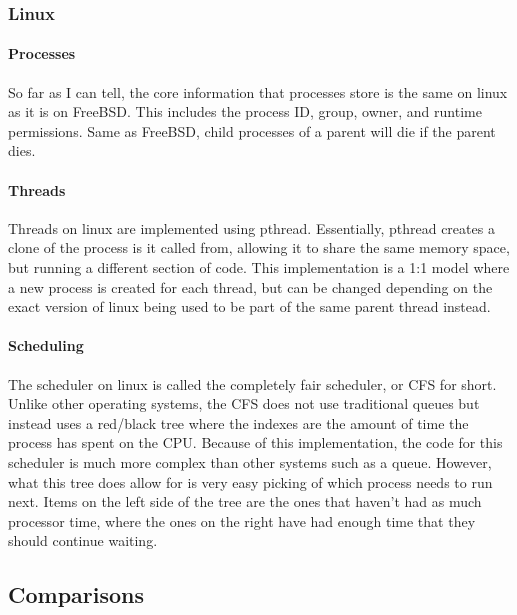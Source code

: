 \subsubsection{Linux}
\paragraph{Processes}
So far as I can tell, the core information that processes store is the same on linux as it is on FreeBSD. This includes the process ID, group, owner, and runtime permissions. Same as FreeBSD, child processes of a parent will die if the parent dies.
\paragraph{Threads}
Threads on linux are implemented using pthread. Essentially, pthread creates a clone of the process is it called from, allowing it to share the same memory space, but running a different section of code. This implementation is a 1:1 model where a new process is created for each thread, but can be changed depending on the exact version of linux being used to be part of the same parent thread instead. 
\paragraph{Scheduling}
The scheduler on linux is called the completely fair scheduler, or CFS for short. Unlike other operating systems, the CFS does not use traditional queues but instead uses a red/black tree where the indexes are the amount of time the process has spent on the CPU. Because of this implementation, the code for this scheduler is much more complex than other systems such as a queue. However, what this tree does allow for is very easy picking of which process needs to run next. Items on the left side of the tree are the ones that haven't had as much processor time, where the ones on the right have had enough time that they should continue waiting.

\subsection{Comparisons}
